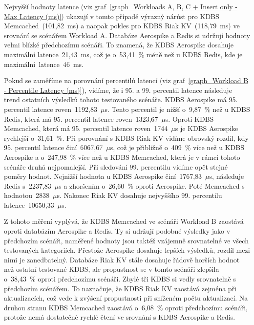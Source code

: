 \documentclass[czech,master,dept460,male,csharp,cpdeclaration]{diploma}
\begin{document}
	Nejvyšší hodnoty latence (viz graf~\ref{graph_Workloads A, B, C + Insert only - Max Latency (ms)}) ukazují v tomto případě výrazný nárůst pro KDBS Memcached~(101,82~ms) a naopak pokles pro KDBS Riak KV~(118,79~ms) ve srovnání se scénářem Workload A. Databáze Aerospike a Redis si udržují hodnoty velmi blízké předchozímu scénáři. To znamená, že KDBS Aerospike dosahuje maximální latence~21,43~ms, což je o~53,41~\% méně než u KDBS Redis, kde je maximální~latence~46~ms.
	
	Pokud se zaměříme na porovnání percentilů latencí (viz graf~\ref{graph_Workload B - Percentile Latency (ms)}), vidíme, že i 95. a 99. percentil latence následuje trend ostatních výsledků tohoto testovaného scénáře. KDBS Aerospike má 95. percentil latence roven~1192,83~$\mu$s. Tento percentil je nižší o~9,87~\% než u KDBS Redis, která má 95. percentil latence roven~1323,67~$\mu$s. Oproti KDBS Memcached, která má 95. percentil latence roven~1744~$\mu$s je KDBS Aerospike rychlejší o~31,61~\%. Při porovnání s KDBS Riak KV vidíme obrovský rozdíl, kdy 95. percentil latence činí~6067,67~$\mu$s, což je přibližně o~409~\% více než u KDBS Aerospike a o~247,98~\% více než u KDBS Memcached, která je v rámci tohoto scénáře druhá nejpomalejší. Při sledování 99. percentilu vidíme opět stejné poměry hodnot. Nejnižší hodnota u KDBS Aerospike činí~1767,83~$\mu$s, následuje Redis s~2237,83~$\mu$s a zhoršením o~26,60~\% oproti Aerospike. Poté Memcached s hodnotou~2838~$\mu$s. Nakonec Riak KV dosahuje nejvyššího 99. percentilu latence~10650,33~$\mu$s.
	
	Z tohoto měření vyplývá, že KDBS Memcached ve scénáři Workload B zaostává oproti databázím Aerospike a Redis. Ty si udržují podobné výsledky jako v předchozím scénáři, naměřené hodnoty jsou taktéž vzájemně srovnatelné ve všech testovaných kategoriích. Přestože Aerospike dosahuje lepších výsledků, rozdíl mezi nimi je zanedbatelný. Databáze Riak KV stále dosahuje řádově horších hodnot než ostatní testované KDBS, ale propustnost se v tomto scénáři zlepšila o~38,43~\% oproti předchozímu scénáři. Zbylé tři KDBS si vedly srovnatelně s předchozím scénářem. To naznačuje, že KDBS Riak KV zaostává zejména při aktualizacích, což vede k zvýšení propustnosti při sníženém počtu aktualizací. Na druhou stranu KDBS Memcached zaostává o~6,08~\% oproti předchozímu scénáři, protože nemá dostatečně rychlé čtení ve srovnání s KDBS Aerospike a Redis.
	
\end{document}
